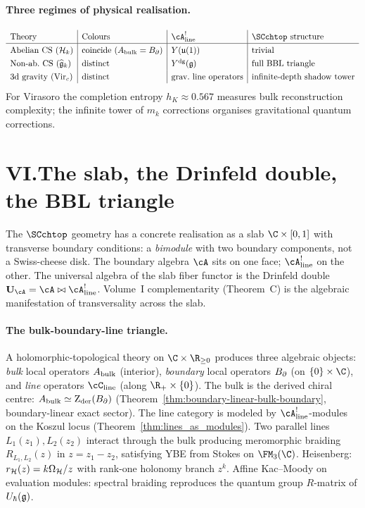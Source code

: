 \paragraph{Three regimes of physical realisation.}
\[
\renewcommand{\arraystretch}{1.3}
\begin{array}{l|l|l|l}
\text{Theory} & \text{Colours} & \cA^!_{\mathrm{line}} &
 \SCchtop \text{ structure} \\
\hline
\text{Abelian CS } (\cH_k) &
 \text{coincide } (\Abulk = \Bbound) &
 Y(\mathfrak{u}(1)) & \text{trivial} \\
\text{Non-ab.~CS } (\widehat{\fg}_k) &
 \text{distinct} & \Ydg(\fg) &
 \text{full BBL triangle} \\
\text{3d gravity } (\mathrm{Vir}_c) &
 \text{distinct} & \text{grav.~line operators} &
 \text{infinite-depth shadow tower}
\end{array}
\]
For Virasoro the completion entropy $h_K \approx 0.567$ measures
bulk reconstruction complexity; the infinite tower of $m_k$
corrections organises gravitational quantum corrections.

\section*{VI.\quad The slab, the Drinfeld double, the BBL triangle}

The $\SCchtop$ geometry has a concrete realisation as a slab
$\C \times [0,1]$ with transverse boundary conditions: a
\emph{bimodule} with two boundary components, not a Swiss-cheese
disk. The boundary algebra $\cA$ sits on one face;
$\cA^!_{\mathrm{line}}$ on the other. The universal algebra of
the slab fiber functor is the Drinfeld double
$\mathbf{U}_\cA = \cA \bowtie \cA^!_{\mathrm{line}}$. Volume~I
complementarity (Theorem~C) is the algebraic manifestation of
transversality across the slab.

\paragraph{The bulk-boundary-line triangle.}
A holomorphic-topological theory on $\C \times \R_{\ge 0}$
produces three algebraic objects: \emph{bulk} local operators
$A_{\mathrm{bulk}}$ (interior), \emph{boundary} local operators $B_{\partial}$
(on $\{0\} \times \C$), and \emph{line} operators
$\cC_{\mathrm{line}}$ (along $\R_+ \times \{0\}$). The bulk is
the derived chiral centre:
$A_{\mathrm{bulk}} \simeq \operatorname{Z}_{\mathrm{der}}(B_{\partial})$
(Theorem~\ref{thm:boundary-linear-bulk-boundary},
boundary-linear exact sector). The line category is modeled by
$\cA^!_{\mathrm{line}}$-modules on the Koszul locus
(Theorem~\ref{thm:lines_as_modules}). Two parallel lines
$L_1(z_1), L_2(z_2)$ interact through the bulk producing
meromorphic braiding $R_{L_1, L_2}(z)$ in $z = z_1 - z_2$,
satisfying YBE from Stokes on $\FM_3(\C)$. Heisenberg:
$r_{\mathcal{H}}(z)=k\Omega_{\mathcal{H}}/z$ with rank-one holonomy branch $z^k$. Affine Kac--Moody on evaluation
modules: spectral braiding reproduces the quantum group
$R$-matrix of $U_\hbar(\mathfrak{g})$.

